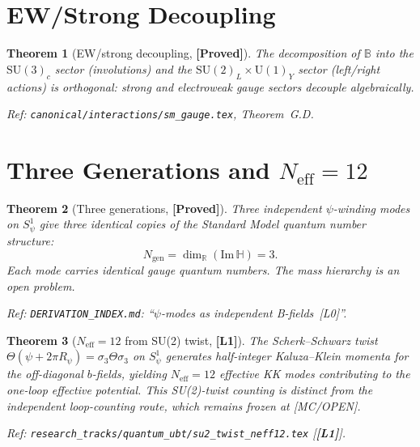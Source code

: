 \documentclass[12pt,a4paper]{article}
\newtheorem{theorem}{Theorem}[section]
\theoremstyle{definition}
\theoremstyle{remark}
\newcommand{\PROVED}{\textbf{[Proved]}}
\newcommand{\SU}[1]{\mathrm{SU}(#1)}
\newcommand{\UU}[1]{\mathrm{U}(#1)}
\newcommand{\Lone}{\textbf{[L1]}}
\begin{document}
\section{EW/Strong Decoupling}
\label{sec:decoupling}

\begin{theorem}[EW/strong decoupling, \PROVED]
\label{thm:decoupling}
The decomposition of $\mathbb{B}$ into the $\SU{3}_c$ sector (involutions)
and the $\SU{2}_L\times\UU{1}_Y$ sector (left/right actions) is orthogonal:
strong and electroweak gauge sectors decouple algebraically.

Ref: \texttt{canonical/interactions/sm\_gauge.tex}, Theorem~G.D.
\end{theorem}

\section{Three Generations and $N_{\mathrm{eff}}=12$}
\label{sec:generations}
\label{sec:neff}

\begin{theorem}[Three generations, \PROVED]
\label{thm:generations}
Three independent $\psi$-winding modes on $S^1_\psi$ give three
identical copies of the Standard Model quantum number structure:
\[
  N_{\mathrm{gen}} = \dim_\mathbb{R}(\mathrm{Im}\,\mathbb{H}) = 3.
\]
Each mode carries identical gauge quantum numbers.
The mass hierarchy is an open problem.

Ref: \texttt{DERIVATION\_INDEX.md}: ``$\psi$-modes as independent B-fields~[L0]''.
\end{theorem}

\begin{theorem}[$N_{\mathrm{eff}}=12$ from SU(2) twist, \Lone]
\label{thm:neff}
The Scherk--Schwarz twist $\Theta(\psi + 2\pi R_\psi) = \sigma_3\Theta\sigma_3$
on $S^1_\psi$ generates half-integer Kaluza--Klein momenta for the
off-diagonal $b$-fields, yielding $N_{\mathrm{eff}} = 12$ effective KK modes
contributing to the one-loop effective potential.
This SU(2)-twist counting is distinct from the independent loop-counting route,
which remains frozen at [MC/OPEN].

Ref: \texttt{research\_tracks/quantum\_ubt/su2\_twist\_neff12.tex} [\Lone].
\end{theorem}
\end{document}
